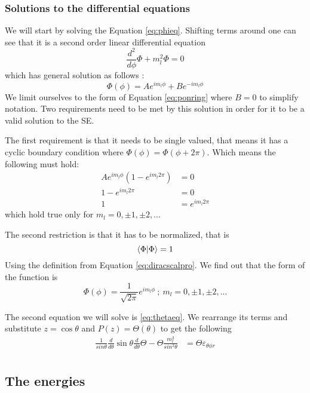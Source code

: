 \documentclass[../master_thesis.tex]{subfiles}
\begin{document}
\subsubsection{Solutions to the differential equations}

We will start by solving the Equation \ref{eq:phieq}. Shifting terms around one
can see that it is a second order linear differential equation
$$\frac{d^2}{d\phi}\Phi + m_l^2\Phi = 0$$ which has general solution as follows
\cite{Edwards:2016, Simons:2016, Atkins:2011}:
\begin{equation}
  \Phi(\phi) = Ae^{im_l\phi} + Be^{-im_l\phi}\label{eq:ponring}
\end{equation}
We limit ourselves to the form of Equation \ref{eq:ponring} where $B = 0$ to simplify
notation. Two requirements need to be met by this solution in order for it to be
a valid solution to the \ac{SE}.

The first requirement is that it needs to be single valued, that means it has
a cyclic boundary condition \cite{Simons:2016, Atkins:2011} where $\Phi(\phi)=\Phi(\phi + 2\pi)$.
Which means the following must hold:
\begin{align}
    Ae^{im_l\phi}\left( 1 - e^{im_l 2\pi}\right) &= 0\\
    1 - e^{im_l 2\pi} &= 0\\
    1 &= e^{im_l 2\pi}
\end{align}
which hold true only for $m_l = 0, \pm 1, \pm 2, ...$

The second restriction is that it has to be normalized, that is $$\braket{\Phi|\Phi} = 1$$
Using the definition from Equation \ref{eq:diracscalpro}. We find out that the form
of the function is
\begin{equation}
  \Phi(\phi) = \frac{1}{\sqrt{2\pi}}e^{im_l\phi} \ ; \ m_l = 0, \pm 1, \pm 2, ...
\end{equation}

The second equation we will solve is \ref{eq:thetaeq}. We rearrange its terms
and substitute $z = \cos{\theta}$ and $P(z) = \Theta(\theta)$ to get the following
\begin{align}
  \frac{1}{sin{\theta}}\frac{d}{d\theta}\sin{\theta}\frac{d}{d\theta}\Theta
  - \Theta \frac{m_l^2}{sin^2{\theta}} &= \Theta\varepsilon_{\theta\phi r} \\
\end{align}
\subsection{The energies}
\end{document}
